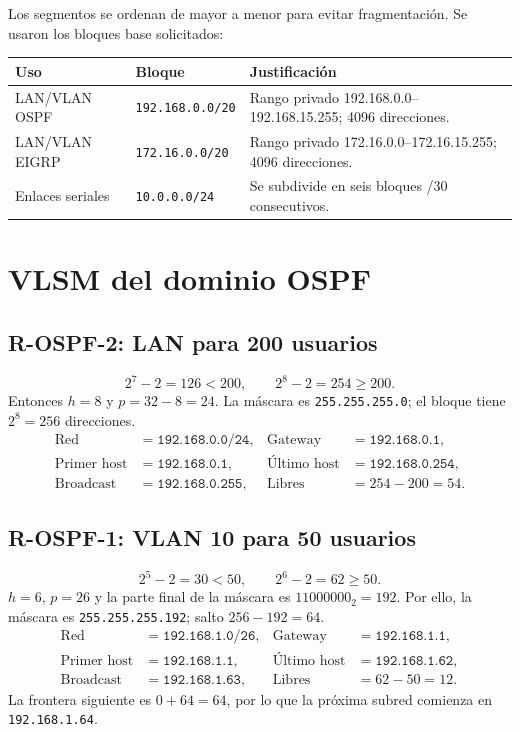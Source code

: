 \documentclass[11pt]{article}
\begin{document}
Los segmentos se ordenan de mayor a menor para evitar fragmentación. Se usaron los bloques base solicitados:

\begin{center}
\begin{tabularx}{\textwidth}{l l Y}
\toprule
Uso & Bloque & Justificación\\
\midrule
LAN/VLAN OSPF & \texttt{192.168.0.0/20} & Rango privado 192.168.0.0--192.168.15.255; 4096 direcciones.\\
LAN/VLAN EIGRP & \texttt{172.16.0.0/20} & Rango privado 172.16.0.0--172.16.15.255; 4096 direcciones.\\
Enlaces seriales & \texttt{10.0.0.0/24} & Se subdivide en seis bloques /30 consecutivos.\\
\bottomrule
\end{tabularx}
\end{center}

\section{VLSM del dominio OSPF}

\subsection{R-OSPF-2: LAN para 200 usuarios}
\begin{calculo}
\[
2^7-2=126<200,\qquad 2^8-2=254\ge200.
\]
Entonces $h=8$ y $p=32-8=24$. La máscara es \texttt{255.255.255.0}; el bloque tiene $2^8=256$ direcciones.
\begin{align*}
\text{Red} &= \texttt{192.168.0.0/24}, & \text{Gateway} &= \texttt{192.168.0.1},\\
\text{Primer host} &= \texttt{192.168.0.1}, & \text{Último host} &= \texttt{192.168.0.254},\\
\text{Broadcast} &= \texttt{192.168.0.255}, & \text{Libres} &=254-200=54.
\end{align*}
\end{calculo}

\subsection{R-OSPF-1: VLAN 10 para 50 usuarios}
\begin{calculo}
\[
2^5-2=30<50,\qquad 2^6-2=62\ge50.
\]
$h=6$, $p=26$ y la parte final de la máscara es $11000000_2=192$. Por ello, la máscara es \texttt{255.255.255.192}; salto $256-192=64$.
\begin{align*}
\text{Red} &= \texttt{192.168.1.0/26}, & \text{Gateway} &= \texttt{192.168.1.1},\\
\text{Primer host} &= \texttt{192.168.1.1}, & \text{Último host} &= \texttt{192.168.1.62},\\
\text{Broadcast} &= \texttt{192.168.1.63}, & \text{Libres} &=62-50=12.
\end{align*}
La frontera siguiente es $0+64=64$, por lo que la próxima subred comienza en \texttt{192.168.1.64}.
\end{calculo}
\end{document}
